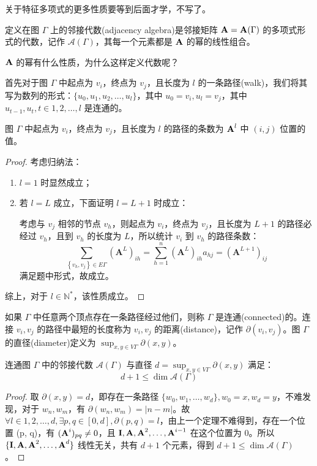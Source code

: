 关于特征多项式的更多性质要等到后面才学，不写了。

\begin{definition}[邻接代数]
定义在图 $\Gamma$ 上的邻接代数(adjacency algebra)是邻接矩阵 $\textbf A = \textbf A(\Gamma)$ 的多项式形式的代数，记作 $\mathcal A(\Gamma)$，其每一个元素都是 $\textbf A$ 的幂的线性组合。
\end{definition}

$\textbf A$ 的幂有什么性质，为什么这样定义代数呢？

首先对于图 $\Gamma$ 中起点为 $v_i$，终点为 $v_j$，且长度为 $l$ 的一条路径(walk)，我们将其写为数列的形式：$\{u_0, u_1, u_2, \dots, u_l\}$，其中 $u_0 = v_i, u_l = v_j$，其中 $u_{t - 1}, u_t, t\in{1,2,\dots,l}$ 是连通的。

\begin{theorem}
图 $\Gamma$ 中起点为 $v_i$，终点为 $v_j$，且长度为 $l$ 的路径的条数为 $\textbf A^l$ 中 $(i, j)$ 位置的值。
\end{theorem}

\begin{proof}
考虑归纳法：
\begin{enumerate}
\item $l = 1$ 时显然成立；
\item 若 $l = L$ 成立，下面证明 $l = L + 1$ 时成立：

考虑与 $v_j$ 相邻的节点 $v_h$，则起点为 $v_i$，终点为 $v_j$，且长度为 $L + 1$ 的路径必经过 $v_h$，且到 $v_h$ 的长度为 $L$，所以统计 $v_i$ 到 $v_h$ 的路径条数：
\[
\sum_{\left\{v_{h}, v_{j}\right\} \in E \Gamma}\left(\mathbf{A}^{L}\right)_{i h}
=\sum_{h=1}^{n}\left(\mathbf{A}^{L}\right)_{i h} a_{h j}
=\left(\mathbf{A}^{L+1}\right)_{i j}
\]
满足题中形式，故成立。
\end{enumerate}

综上，对于 $l \in \mathbb N^*$，该性质成立。
\end{proof}

如果 $\Gamma$ 中任意两个顶点存在一条路径经过他们，则称 $\Gamma$ 是连通(connected)的。连接 $v_i, v_j$ 的路径中最短的长度称为 $v_i, v_j$ 的距离(distance)，记作 $\partial (v_i, v_j)$。图 $\Gamma$ 的直径(diameter)定义为 $\sup_{x,y\in V\Gamma} \partial (x, y)$。

\begin{theorem}
连通图 $\Gamma$ 中的邻接代数 $\mathcal A(\Gamma)$ 与直径 $d = \sup_{x,y\in V\Gamma} \partial (x, y)$ 满足：
\[
d + 1 \le \dim \mathcal A(\Gamma)
\]
\end{theorem}
\begin{proof}
取 $\partial (x, y) = d$，即存在一条路径 $\{w_0, w_1, \dots, w_d\}, w_0 = x, w_d = y$，不难发现，对于 $w_n, w_m$，有 $\partial(w_n, w_m) = |n - m|$。故 $\forall l \in {1, 2, \dots, d}, \exists p,q\in [0,d], \partial(p, q) = l$，由上一个定理不难得到，存在一个位置 (p, q)，有 $(\textbf A^i)_{pq} \neq 0$，且 $\textbf I, \textbf A, \textbf A^2, \dots, \textbf A^{i - 1}$ 在这个位置为 $0$。所以 $\{\textbf I, \textbf A, \textbf A^2, \dots, \textbf A^d\}$ 线性无关，共有 $d + 1$ 个元素，得到 $d + 1 \le \dim \mathcal A(\Gamma)$。
\end{proof}

